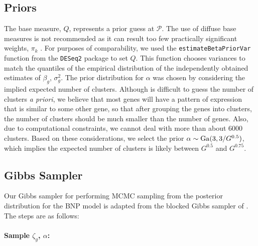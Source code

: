 \subsection{Priors}
The base measure, $Q$, represents a prior guess at $\mathcal{P}$. The use of diffuse base measures is not recommended as it can result too few practically significant weights, $\pi_k$ \citep[p.554]{gelman-book}. For purposes of comparability, we used the \texttt{estimateBetaPriorVar} function from the \texttt{DESeq2} package to set $Q$. This function chooses variances to match the quantiles of the empirical distribution of the independently obtained estimates of $\beta_g$, $\sigma_g^2$. The prior distribution for $\alpha$ was chosen by considering the implied expected number of clusters. Although is difficult to guess the number of clusters \textit{a priori}, we believe that most genes will have a pattern of expression that is similar to some other gene, so that after grouping the genes into clusters, the number of clusters should be much smaller than the number of genes. Also, due to computational constraints, we cannot deal with more than about 6000 clusters. Based on these considerations, we select the prior $\alpha \sim \operatorname{Ga}(3,3/G^{0.5})$, which implies the expected number of clusters is likely between $G^{0.5}$ and $G^{0.75}$.


\subsection{Gibbs Sampler}
Our Gibbs sampler for performing MCMC sampling from the posterior distribution for the BNP model is adapted from the blocked Gibbs sampler of \citet{ishwaran2000}. The steps are as follows:

\paragraph{Sample $\zeta_g$, $\alpha$:}

